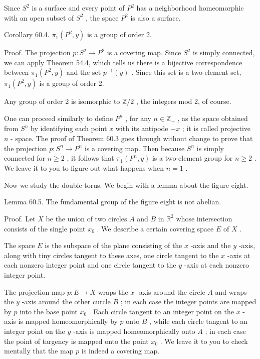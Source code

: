 \documentclass[10pt]{article}
\begin{document}
Since \({S}^{2}\) is a surface and every point of \({P}^{2}\) has a neighborhood homeomorphic with an open subset of \({S}^{2}\) , the space \({P}^{2}\) is also a surface.

Corollary 60.4. \({\pi }_{1}\left( {{P}^{2},y}\right)\) is a group of order 2.

Proof. The projection \(p : {S}^{2} \rightarrow  {P}^{2}\) is a covering map. Since \({S}^{2}\) is simply connected, we can apply Theorem 54.4, which tells us there is a bijective correspondence between \({\pi }_{1}\left( {{P}^{2},y}\right)\) and the set \({p}^{-1}\left( y\right)\) . Since this set is a two-element set, \({\pi }_{1}\left( {{P}^{2},y}\right)\) is a group of order 2.

Any group of order 2 is isomorphic to \(\mathbb{Z}/2\) , the integers mod 2, of course.

One can proceed similarly to define \({P}^{n}\) , for any \(n \in  {\mathbb{Z}}_{ + }\) , as the space obtained from \({S}^{n}\) by identifying each point \(x\) with its antipode \(- x\) ; it is called projective \(n\) - space. The proof of Theorem 60.3 goes through without change to prove that the projection \(p : {S}^{n} \rightarrow  {P}^{n}\) is a covering map. Then because \({S}^{n}\) is simply connected for \(n \geq  2\) , it follows that \({\pi }_{1}\left( {{P}^{n},y}\right)\) is a two-element group for \(n \geq  2\) . We leave it to you to figure out what happens when \(n = 1\) .

Now we study the double torus. We begin with a lemma about the figure eight.

Lemma 60.5. The fundamental group of the figure eight is not abelian.

Proof. Let \(X\) be the union of two circles \(A\) and \(B\) in \({\mathbb{R}}^{2}\) whose intersection consists of the single point \({x}_{0}\) . We describe a certain covering space \(E\) of \(X\) .

The space \(E\) is the subspace of the plane consisting of the \(x\) -axis and the \(y\) -axis, along with tiny circles tangent to these axes, one circle tangent to the \(x\) -axis at each nonzero integer point and one circle tangent to the \(y\) -axis at each nonzero integer point.

The projection map \(p : E \rightarrow  X\) wraps the \(x\) -axis around the circle \(A\) and wraps the \(y\) -axis around the other curcle \(B\) ; in each case the integer points are mapped by \(p\) into the base point \({x}_{0}\) . Each circle tangent to an integer point on the \(x\) -axis is mapped homeomorphically by \(p\) onto \(B\) , while each circle tangent to an integer point on the \(y\) -axis is mapped homeomorphically onto \(A\) ; in each case the point of targency is mapped onto the point \({x}_{0}\) . We leave it to you to check mentally that the map \(p\) is indeed a covering map.
\end{document}
